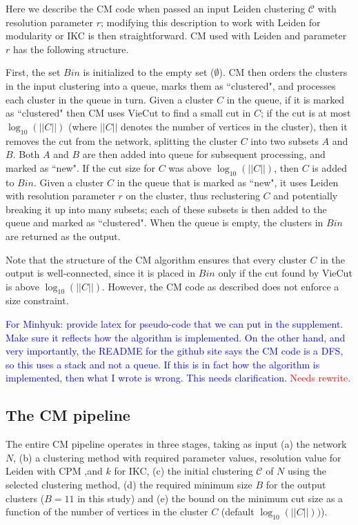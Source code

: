 \documentclass[12pt, oneside]{article}   	%
\begin{document}
Here we describe the CM code when passed an input  Leiden clustering $\mathcal{C}$  with resolution parameter $r$; modifying this description to work with 
Leiden for modularity or IKC is then straightforward.
CM used with Leiden and parameter $r$ has the following structure.


First, the set $Bin$ is initialized to the empty set  ($\emptyset$).
CM  then orders the clusters in the input clustering into a queue,  marks them as ``clustered", and processes each cluster in the queue in turn.
Given a cluster $C$ in the queue, if it is marked as ``clustered" then CM uses VieCut to find a small cut in $C$;  if the cut is at most $\log_{10}(||C||)$ (where $||C||$ denotes the number of 
vertices in the cluster), then it removes the cut from the network, splitting the cluster $C$ into two  subsets $A$ and $B$.
Both $A$ and $B$ are then added into  queue for subsequent processing, and marked as ``new". 
If the cut size for $C$ was above $\log_{10}(||C||)$, then $C$ is added to $Bin$.
Given a cluster $C$ in the queue that is marked as ``new", it uses Leiden with resolution parameter $r$ on the cluster, thus reclustering $C$
and potentially breaking it up into many subsets; each of these subsets is then added to the queue and marked as ``clustered".
When the queue is empty, the clusters in $Bin$ are returned as the output.

Note that the structure of the CM algorithm ensures that every cluster $C$ in the output is well-connected, since it is 
placed in $Bin$ only if the cut found by VieCut is above $\log_{10}(||C||)$.
However, the CM code as described does not enforce a size constraint.

\textcolor{blue}{For Minhyuk: provide latex for pseudo-code that we can put in the supplement. Make sure it reflects how the algorithm is implemented. On the other hand, and very importantly, the README for the github site says the CM code is a DFS, so this uses a stack and not a queue.  If this is in fact how the algorithm is implemented, then what I wrote is wrong. This needs clarification.} \textcolor{red}{Needs rewrite}.

\subsection{The CM pipeline}
The entire CM pipeline operates in three stages, taking as input (a) the network $N$,  (b) a clustering method with required parameter values,  resolution value for Leiden with CPM ,and $k$ for IKC,
(c)  the initial clustering $\mathcal{C}$ of $N$ using the selected clustering method, 
(d) the required minimum size $B$ for the output clusters ($B=11$ in this study)
and (e) the bound on the minimum cut size as a function of the number of vertices in the cluster $C$
(default $\log_{10}(||C||))$).
\end{document}
